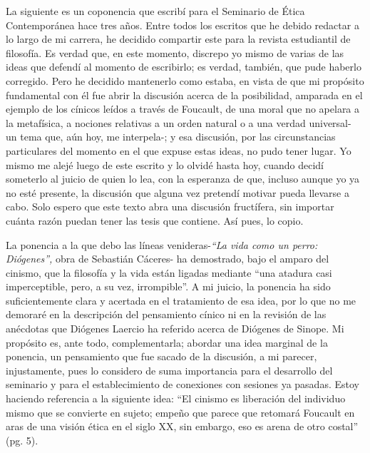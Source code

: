 
\begin{refsection}
\vspace{-1em}
La siguiente es un coponencia que escribí para el Seminario de Ética Contemporánea hace tres años. Entre todos los escritos que he debido redactar a lo largo de mi carrera, he decidido compartir este para la revista estudiantil de filosofía. Es verdad que, en este momento, discrepo yo mismo de varias de las ideas que defendí al momento de escribirlo; es verdad, también, que pude haberlo corregido. Pero he decidido mantenerlo como estaba, en vista de que mi propósito fundamental con él fue abrir la discusión acerca de la posibilidad, amparada en el ejemplo de los cínicos leídos a través de Foucault, de una moral que no apelara a la metafísica, a nociones relativas a un orden natural o a una verdad universal- un tema que, aún hoy, me interpela-; y esa discusión, por las circunstancias particulares del momento en el que expuse estas ideas, no pudo tener lugar. Yo mismo me alejé luego de este escrito y lo olvidé hasta hoy, cuando decidí someterlo al juicio de quien lo lea, con la esperanza de que, incluso aunque yo ya no esté presente, la discusión que alguna vez pretendí motivar pueda llevarse a cabo. Solo espero que este texto abra una discusión fructífera, sin importar cuánta razón puedan tener las tesis que contiene. Así pues, lo copio.

La ponencia a la que debo las líneas venideras-\emph{``La vida como un perro: Diógenes'',} obra de Sebastián Cáceres- ha demostrado, bajo el amparo del cinismo, que la filosofía y la vida están ligadas mediante ``una atadura casi imperceptible, pero, a su vez, irrompible''. A mi juicio, la ponencia ha sido suficientemente clara y acertada en el tratamiento de esa idea, por lo que no me demoraré en la descripción del pensamiento cínico ni en la revisión de las anécdotas que Diógenes Laercio ha referido acerca de Diógenes de Sinope. Mi propósito es, ante todo, complementarla; abordar una idea marginal de la ponencia, un pensamiento que fue sacado de la discusión, a mi parecer, injustamente, pues lo considero de suma importancia para el desarrollo del seminario y para el establecimiento de conexiones con sesiones ya pasadas. Estoy haciendo referencia a la siguiente idea: ``El cinismo es liberación del individuo mismo que se convierte en sujeto; empeño que parece que retomará Foucault en aras de una visión ética en el siglo XX, sin embargo, eso es arena de otro costal'' (pg. 5).


\end{refsection}
